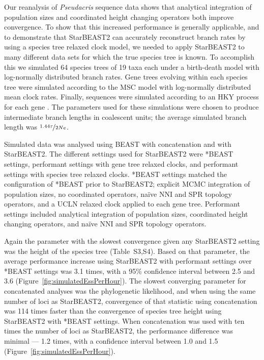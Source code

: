 \documentclass[12pt]{article}
\begin{document}
Our reanalysis of \textit{Pseudacris} sequence data shows that analytical
integration of population sizes and coordinated height changing operators both
improve convergence. To show that this increased performance is generally
applicable, and to demonstrate that StarBEAST2 can accurately reconstruct branch
rates by using a species tree relaxed clock model, we needed to apply StarBEAST2 to
many different data sets for which the true species tree is known. To accomplish
this we simulated 64 species trees of 19 taxa each under a birth-death model
with log-normally distributed branch rates. Gene trees evolving within each
species tree were simulated according to the MSC model with
log-normally distributed mean clock rates. Finally, sequences were simulated
according to an HKY process for each gene \citep{Hasegawa1985, Goldman1993}. The
parameters used for these simulations were chosen to produce intermediate
branch lengths in coalescent units; the average simulated branch length was
$\nicefrac{1.44\tau}{2Ne}$.

Simulated data was analysed using BEAST with concatenation and with StarBEAST2.
The different settings used for StarBEAST2 were *BEAST settings, performant
settings with gene tree relaxed clocks, and performant settings with species
tree relaxed clocks. *BEAST settings matched the configuration of *BEAST prior
to StarBEAST2; explicit MCMC integration of population sizes, no coordinated
operators, na\"ive NNI and SPR topology operators, and a UCLN relaxed clock
applied to each gene tree. Performant settings included analytical integration of
population sizes, coordinated height changing operators, and na\"ive NNI and SPR
topology operators.

Again the parameter with the slowest convergence given any StarBEAST2 setting
was the height of the species tree (Table~S3,S4). Based on that parameter, the
average performance increase using StarBEAST2 with performant settings over
*BEAST settings was 3.1 times, with a 95\% confidence interval between 2.5 and
3.6 (Figure~\ref{fig:simulatedEssPerHour}). The slowest converging parameter for
concatenated analyses was the phylogenetic likelihood, and when using the same
number of loci as StarBEAST2, convergence of that statistic using concatenation
was 114 times faster than the convergence of species tree height using
StarBEAST2 with *BEAST settings. When concatenation was used with ten times the
number of loci as StarBEAST2, the performance difference was minimal --- 1.2
times, with a confidence interval between 1.0 and 1.5
(Figure~\ref{fig:simulatedEssPerHour}).
\end{document}
